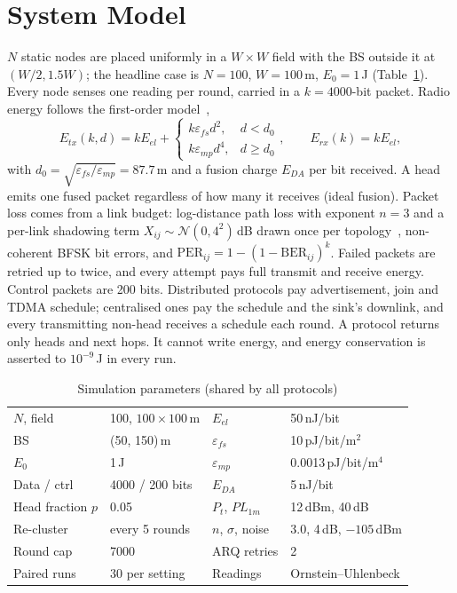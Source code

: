 \section{System Model}
$N$ static nodes are placed uniformly in a $W\times W$ field with the BS outside it at $(W/2,1.5W)$; the headline case is $N{=}100$, $W{=}100$\,m, $E_0{=}1$\,J (Table~\ref{tab:params}). Every node senses one reading per round, carried in a $k{=}4000$-bit packet. Radio energy follows the first-order model~\cite{heinzelman2002leachc},
\begin{equation}
E_{tx}(k,d)=kE_{el}+\begin{cases}k\varepsilon_{fs}d^2, & d<d_0\\ k\varepsilon_{mp}d^4, & d\ge d_0\end{cases},\qquad E_{rx}(k)=kE_{el},
\label{eq:radio}
\end{equation}
with $d_0=\sqrt{\varepsilon_{fs}/\varepsilon_{mp}}=87.7$\,m and a fusion charge $E_{DA}$ per bit received. A head emits one fused packet regardless of how many it receives (ideal fusion). Packet loss comes from a link budget: log-distance path loss with exponent $n{=}3$ and a per-link shadowing term $X_{ij}\sim\mathcal N(0,4^2)$\,dB drawn once per topology~\cite{rappaport2002wireless}, non-coherent BFSK bit errors, and $\text{PER}_{ij}=1-(1-\text{BER}_{ij})^k$. Failed packets are retried up to twice, and every attempt pays full transmit and receive energy. Control packets are 200 bits. Distributed protocols pay advertisement, join and TDMA schedule; centralised ones pay the schedule and the sink's downlink, and every transmitting non-head receives a schedule each round. A protocol returns only heads and next hops. It cannot write energy, and energy conservation is asserted to $10^{-9}$\,J in every run.

\begin{table}[t]
\caption{Simulation parameters (shared by all protocols)}
\label{tab:params}
\centering\footnotesize
\begin{tabular}{@{}ll@{\hspace{8pt}}ll@{}}
\toprule
$N$, field & 100, $100{\times}100$\,m & $E_{el}$ & 50\,nJ/bit\\
BS & (50, 150)\,m & $\varepsilon_{fs}$ & 10\,pJ/bit/m$^2$\\
$E_0$ & 1\,J & $\varepsilon_{mp}$ & 0.0013\,pJ/bit/m$^4$\\
Data / ctrl & 4000 / 200 bits & $E_{DA}$ & 5\,nJ/bit\\
Head fraction $p$ & 0.05 & $P_t$, $PL_{1m}$ & 12\,dBm, 40\,dB\\
Re-cluster & every 5 rounds & $n$, $\sigma$, noise & 3.0, 4\,dB, $-105$\,dBm\\
Round cap & 7000 & ARQ retries & 2\\
Paired runs & 30 per setting & Readings & Ornstein--Uhlenbeck\\
\bottomrule
\end{tabular}
\end{table}

